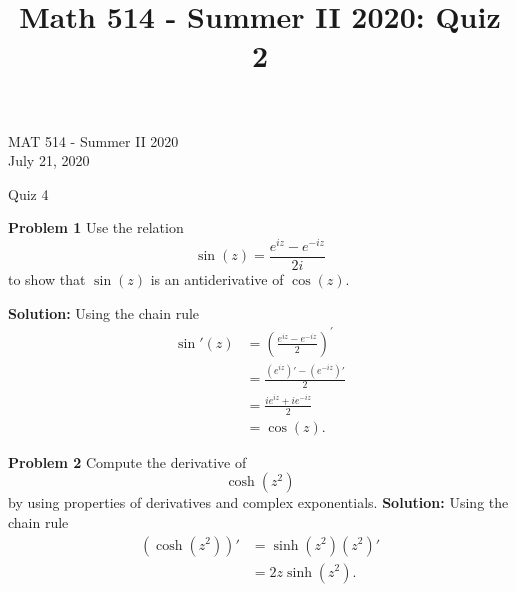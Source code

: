\documentclass[12pt,oneside]{exam}
\title{Math 514 - Summer II 2020: Quiz 2}
\newenvironment{exercise}[1]{\vspace{.1in}\noindent\textbf{Problem #1 \hspace{.05em}}}{}
\begin{document}
\begin{flushright}
\sc MAT 514 - Summer II 2020\\
July 21, 2020
\end{flushright}
\bigskip
 
\begin{center}
\textsf{Quiz 4} 
\end{center}


\begin{exercise}{1}
Use the relation
\begin{equation*}
\sin(z) = \frac{e^{iz}-e^{-iz}}{2i}
\end{equation*}
to show that $\sin(z)$ is an antiderivative of $\cos(z)$. 
\end{exercise}

\noindent \textbf{Solution:} Using the chain rule
\begin{align*}
\sin'(z) & = \left( \frac{e^{iz}-e^{-iz}}{2}\right)^{'} \\
& = \frac{(e^{iz})'-(e^{-iz})'}{2} \\
& = \frac{ie^{iz}+ie^{-iz}}{2}\\
& = \cos(z).
\end{align*}
\vfill

\begin{exercise}{2}
Compute the derivative of 
\begin{equation*}
\cosh(z^2) 
\end{equation*}
by using properties of derivatives and complex exponentials.
\end{exercise}
\noindent \textbf{Solution:} Using the chain rule
\begin{align*}
(\cosh(z^2))' & = \sinh(z^2)(z^2)' \\
& = 2z\sinh(z^2).
\end{align*}
\vfill
\end{document}
